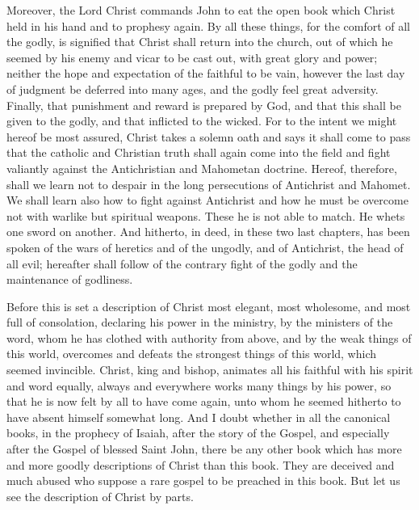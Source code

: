 Moreover, the Lord Christ commands John to eat the open book which Christ held in his hand and to prophesy again. By all these things, for the comfort of all the godly, is signified that Christ shall return into the church, out of which he seemed by his enemy and vicar to be cast out, with great glory and power; neither the hope and expectation of the faithful to be vain, however the last day of judgment be deferred into many ages, and the godly feel great adversity. Finally, that punishment and reward is prepared by God, and that this shall be given to the godly, and that inflicted to the wicked. For to the intent we might hereof be most assured, Christ takes a solemn oath and says it shall come to pass that the catholic and Christian truth shall again come into the field and fight valiantly against the Antichristian and Mahometan doctrine. Hereof, therefore, shall we learn not to despair in the long persecutions of Antichrist and Mahomet. We shall learn also how to fight against Antichrist and how he must be overcome not with warlike but spiritual weapons. These he is not able to match. He whets one sword on another. And hitherto, in deed, in these two last chapters, has been spoken of the wars of heretics and of the ungodly, and of Antichrist, the head of all evil; hereafter shall follow of the contrary fight of the godly and the maintenance of godliness.

Before this is set a description of Christ most elegant, most wholesome, and most full of consolation, declaring his power in the ministry, by the ministers of the word, whom he has clothed with authority from above, and by the weak things of this world, overcomes and defeats the strongest things of this world, which seemed invincible. Christ, king and bishop, animates all his faithful with his spirit and word equally, always and everywhere works many things by his power, so that he is now felt by all to have come again, unto whom he seemed hitherto to have absent himself somewhat long. And I doubt whether in all the canonical books, in the prophecy of Isaiah, after the story of the Gospel, and especially after the Gospel of blessed Saint John, there be any other book which has more and more goodly descriptions of Christ than this book. They are deceived and much abused who suppose a rare gospel to be preached in this book. But let us see the description of Christ by parts.

